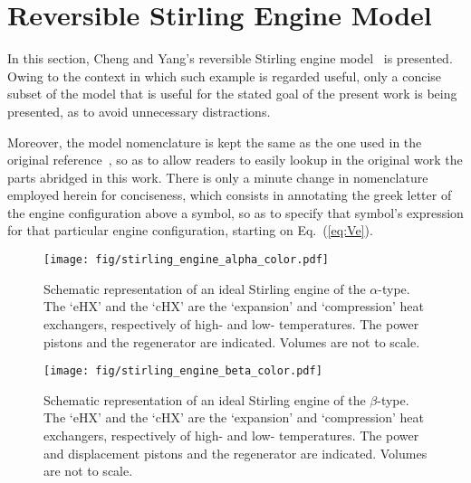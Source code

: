\section{Reversible Stirling Engine Model}

    In     this     section,     Cheng     and     Yang's     reversible     Stirling     engine
    model~\cite{2012-ChengCH+YangHS-ApEnergy} is presented. Owing to the context in  which  such
    example is regarded useful, only a concise subset of the model that is useful for the stated
    goal of the present work is being presented, as to avoid unnecessary distractions.

    Moreover, the model nomenclature  is  kept  the  same  as  the  one  used  in  the  original
    reference~\cite{2012-ChengCH+YangHS-ApEnergy}, so as to allow readers to  easily  lookup  in
    the original work the parts abridged in  this  work.  There  is  only  a  minute  change  in
    nomenclature employed herein for conciseness, which consists in annotating the greek  letter
    of the engine configuration above a symbol, so as to specify that  symbol's  expression  for
    that particular engine configuration, starting on Eq.~(\ref{eq:Ve}).

    \begin{figure}[ht]
        \centering
        \texttt{[image: fig/stirling\_engine\_alpha\_color.pdf]}
        \caption{Schematic representation of an ideal Stirling engine of the $\alpha$-type.  The
            `eHX'  and  the  `cHX'  are  the  `expansion'  and  `compression'  heat  exchangers,
            respectively of high- and low- temperatures. The power pistons and  the  regenerator
            are indicated. Volumes are not to scale.}
        \label{fig:alpha}
    \end{figure}

    \begin{figure}[ht]
        \centering
        \texttt{[image: fig/stirling\_engine\_beta\_color.pdf]}
        \caption{Schematic representation of an ideal Stirling engine of the  $\beta$-type.  The
            `eHX'  and  the  `cHX'  are  the  `expansion'  and  `compression'  heat  exchangers,
            respectively of high- and low- temperatures. The power and displacement pistons  and
            the regenerator are indicated. Volumes are not to scale.}
        \label{fig:beta}
    \end{figure}

